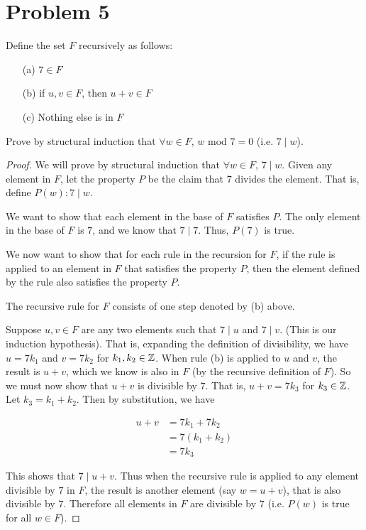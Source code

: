 \documentclass[12pt, a4paper]{amsart}
\theoremstyle{definition}
\theoremstyle{remark}
\numberwithin{Theorem}{section}
\begin{document}
\newpage


\section{Problem 5}


Define the set $F$ recursively as follows:

\begin{enumerate}
    \item [(a)] $7 \in F$
    \item [(b)] if $u, v \in F$, then $u + v \in F$
    \item [(c)] Nothing else is in $F$
\end{enumerate}

Prove by structural induction that $\forall w \in F$, $w$ mod $7 = 0$
(i.e. $7 \mid w$).

\begin{proof}
We will prove by structural induction that $\forall w \in F$, $7 \mid w$.
Given any element in $F$, let the property $P$ be the claim that
$7$ divides the element. That is, define $P(w): 7 \mid w$.

\base

We want to show that each element in the base of $F$ satisfies $P$.
The only element in the base of $F$ is $7$, and we know that $7 \mid 7$.
Thus, $P(7)$ is true.

\istep

We now want to show that for each rule in the recursion for $F$,
if the rule is applied to an element in $F$ that satisfies
the property $P$, then the element defined by the rule also
satisfies the property $P$.

The recursive rule for $F$ consists of one step denoted by (b) above.

Suppose $u, v \in F$ are any two elements such that 
$7 \mid u$ and $7 \mid v$. (This is our induction hypothesis).
That is, expanding the definition of divisibility, we have
$u = 7k_1$ and $v = 7k_2$ for $k_1, k_2 \in \mathbb Z$.
When rule (b) is applied to $u$ and $v$, the result is $u + v$,
which we know is also in $F$ (by the recursive definition of $F$). 
So we must now show that $u + v$ is divisible by $7$.
That is, $u + v = 7k_3$ for $k_3 \in \mathbb Z$. Let $k_3 = k_1 + k_2$.
Then by substitution, we have

\begin{align*}
    u + v &= 7k_1 + 7k_2 \\
    &= 7(k_1 + k_2) \\
    &= 7k_3
\end{align*}

This shows that $7 \mid u + v$.
Thus when the recursive rule is applied to any element divisible
by $7$ in $F$, the result is another element (say $w = u + v$),
that is also divisible by $7$. Therefore all elements in $F$
are divisible by $7$ (i.e. $P(w)$ is true for all $w \in F$).

\end{proof}
\end{document}
